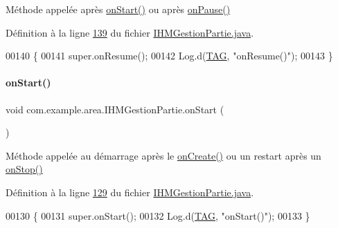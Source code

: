 Méthode appelée après \hyperlink{classcom_1_1example_1_1area_1_1_i_h_m_gestion_partie_a132b61f448998b41a12ef50994350c92}{on\+Start()} ou après \hyperlink{classcom_1_1example_1_1area_1_1_i_h_m_gestion_partie_a05a8b1eabc376a9d06150eaed696e53e}{on\+Pause()} 



Définition à la ligne \hyperlink{_i_h_m_gestion_partie_8java_source_l00139}{139} du fichier \hyperlink{_i_h_m_gestion_partie_8java_source}{I\+H\+M\+Gestion\+Partie.\+java}.


\begin{DoxyCode}
00140     \{
00141         super.onResume();
00142         Log.d(\hyperlink{classcom_1_1example_1_1area_1_1_i_h_m_gestion_partie_a78af1eb84e4a48b7f69c3ebee193933c}{TAG}, \textcolor{stringliteral}{"onResume()"});
00143     \}
\end{DoxyCode}
\mbox{\label{classcom_1_1example_1_1area_1_1_i_h_m_gestion_partie_a132b61f448998b41a12ef50994350c92}} 
\paragraph{\texorpdfstring{on\+Start()}{onStart()}}
{\footnotesize\ttfamily void com.\+example.\+area.\+I\+H\+M\+Gestion\+Partie.\+on\+Start (\begin{DoxyParamCaption}{ }\end{DoxyParamCaption})\hspace{0.3cm}{\ttfamily [protected]}}



Méthode appelée au démarrage après le \hyperlink{classcom_1_1example_1_1area_1_1_i_h_m_gestion_partie_a501249e0f0625aa3e0784ce5f2b51cd8}{on\+Create()} ou un restart après un \hyperlink{classcom_1_1example_1_1area_1_1_i_h_m_gestion_partie_a67aa6746480bdba2a5744a2ff8d6c48d}{on\+Stop()} 



Définition à la ligne \hyperlink{_i_h_m_gestion_partie_8java_source_l00129}{129} du fichier \hyperlink{_i_h_m_gestion_partie_8java_source}{I\+H\+M\+Gestion\+Partie.\+java}.


\begin{DoxyCode}
00130     \{
00131         super.onStart();
00132         Log.d(\hyperlink{classcom_1_1example_1_1area_1_1_i_h_m_gestion_partie_a78af1eb84e4a48b7f69c3ebee193933c}{TAG}, \textcolor{stringliteral}{"onStart()"});
00133     \}
\end{DoxyCode}
\mbox{\label{classcom_1_1example_1_1area_1_1_i_h_m_gestion_partie_a67aa6746480bdba2a5744a2ff8d6c48d}} 
